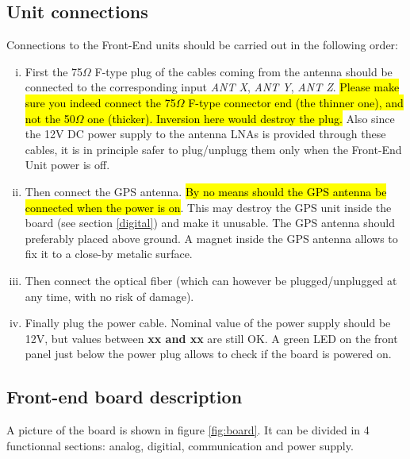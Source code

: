\subsection{Unit connections}
\label{connection}
Connections to the Front-End units should be carried out in the following order:
\begin{enumerate}[i)]
\item {First the 75$\Omega$ F-type plug of the cables coming from the antenna should be connected to the corresponding input {\it ANT X}, {\it ANT Y}, {\it ANT Z}. \hl{Please make sure you indeed connect the 75$\Omega$ F-type connector end (the thinner one), and not the 50$\Omega$ one (thicker). Inversion here would destroy the plug.} Also since the 12V DC power supply to the antenna LNAs is provided through these cables, it is in principle safer to plug/unplugg them only when the Front-End Unit power is off. }
\item {Then connect the GPS antenna. \hl{By no means should the GPS antenna be connected when the power is on}. This may destroy the GPS unit inside the board (see section \ref{digital}) and make it unusable. The GPS antenna should preferably placed above ground. A magnet inside the GPS antenna allows to fix it to a close-by metalic surface. }
\item {Then connect the optical fiber (which can however be plugged/unplugged at any time, with no risk of damage). }
\item {Finally plug the power cable. Nominal value of the power supply should be 12V, but values between {\bf xx and xx} are still OK. A green LED on the front panel just below the power plug allows to check if the board is powered on.}
\end{enumerate}

\subsection{Front-end board description}
A picture of the board is shown in figure \ref{fig:board}. It can be divided in 4 functionnal sections: analog, digitial, communication and power supply.

